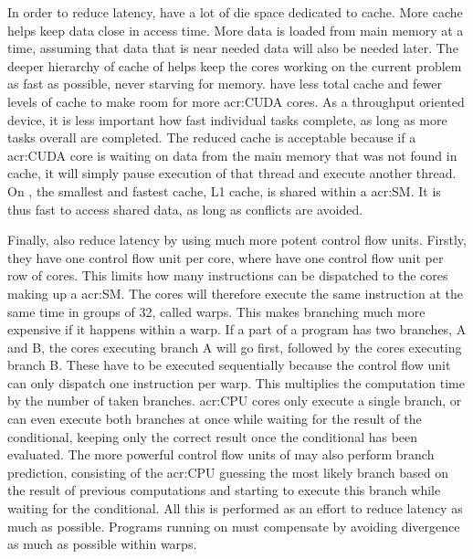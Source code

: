 In order to reduce latency,  have a lot of die space dedicated to cache. More
cache helps keep data close in access time. More data is loaded from main memory at a time, assuming
that data that is near needed data will also be needed later. The deeper hierarchy of cache of
 helps keep the cores working on the current problem as fast as possible, never
starving for memory.  have less total cache and fewer levels of cache to make
room for more \acrshort{acr:CUDA} cores. As a throughput oriented device, it is less important how
fast individual tasks complete, as long as more tasks overall are completed. The reduced cache is
acceptable because if a \acrshort{acr:CUDA} core is waiting on data from the main memory that was
not found in cache, it will simply pause execution of that thread and execute another thread. On
, the smallest and fastest cache, L1 cache, is shared within a
\acrshort{acr:SM}. It is thus fast to access shared data, as long as conflicts are avoided.

Finally,  also reduce latency by using much more potent control flow units.
Firstly, they have one control flow unit per core, where  have one control flow
unit per row of cores. This limits how many instructions can be dispatched to the cores making up a
\acrshort{acr:SM}. The cores will therefore execute the same instruction at the same time in groups
of 32, called warps. This makes branching much more expensive if it happens within a warp. If a part
of a program has two branches, A and B, the cores executing branch A will go first, followed by the
cores executing branch B. These have to be executed sequentially because the control flow unit can
only dispatch one instruction per warp. This multiplies the computation time by the number of taken
branches. \Acrshort{acr:CPU} cores only execute a single branch, or can even execute both branches
at once while waiting for the result of the conditional, keeping only the correct result once the
conditional has been evaluated. The more powerful control flow units of  may
also perform branch prediction, consisting of the \acrshort{acr:CPU} guessing the most likely branch
based on the result of previous computations and starting to execute this branch while waiting for
the conditional. All this is performed as an effort to reduce latency as much as possible. Programs
running on  must compensate by avoiding divergence as much as possible within
warps.

